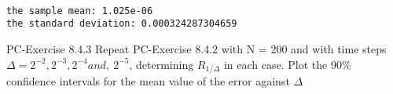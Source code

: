 \documentclass[dvipdfmx,cjk]{beamer}
\numberwithin{equation}{section}
\begin{document}
\begin{frame}[containsverbatim]
    \begin{center}
    \end{center}
    { \hspace*{\fill} \\}
    
    \begin{Verbatim}[commandchars=\\\{\}]
the sample mean: 1.025e-06
the standard deviation: 0.000324287304659

    \end{Verbatim}
\end{frame}
\begin{frame}
PC-Exercise 8.4.3
Repeat PC-Exercise 8.4.2 with N = 200
and with time steps $\Delta = 2^{-2} , 2^{-3} , 2^{-4} and,\  2^{-5} $, determining $R_{1/\Delta}$  in each
case. Plot the 90\%
 confidence intervals for the mean value of the error against $\Delta$

\end{frame}
\begin{frame}
    \begin{center}
    \end{center}
    { \hspace*{\fill} \\}
\end{frame}
\end{document}

